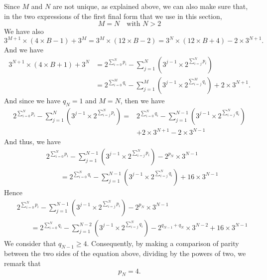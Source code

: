 \documentclass[11pt,a4paper]{article}
\newcommand{\Pf}[4]{2^{\sum_{#4=0}^{#1}#3_{#4}}-\sum_{j=1}^{#2}\left(3^{j-1}\times 2^{\sum_{#4=j}^{#1}#3_{#4}}\right)}
\theoremstyle{definition}
\begin{document}
Since $M$ and $N$ are not unique, as explained above, we can also make sure that, in the two
expressions of the first final form that we use in this section,
\begin{equation}
M=N\quad\text{with }N>2
\end{equation}
We have also
\begin{equation}
3^{M+1}\times(4\times B-1)+3^{M}=3^{M}\times(12\times B-2)=3^{N}\times(12\times B+4)-2\times 3^{N+1}.
\end{equation}
And we have
\begin{equation}
\begin{split}
3^{N+1}\times(4\times B+1)+3^{N}&=\Pf{N}{N}{p}{i}\\
&=\Pf{M}{M}{q}{i}+2\times 3^{N+1}.
\end{split}
\end{equation}
And since we have $q_N=1$ and $M=N$, then we have
\begin{equation}
\begin{split}
\Pf{N}{N}{p}{i}
={}&2^{\sum_{i=0}^{N}q_i}-\sum_{j=1}^{N-1}\left(3^{j-1}\times 2^{\sum_{i=j}^{N}q_i}\right)\\
&+2\times 3^{N+1}-2\times 3^{N-1}
\end{split}
\end{equation}
And thus, we have
\begin{equation}
\begin{split}
&2^{\sum_{i=0}^{N}p_i}-\sum_{j=1}^{N-1}\left(3^{j-1}\times 2^{\sum_{i=j}^{N}p_i}\right)-2^{p_N}\times 3^{N-1}\\
&\qquad=2^{\sum_{i=0}^{N}q_i}-\sum_{j=1}^{N-1}\left(3^{j-1}\times 2^{\sum_{i=j}^{N}q_i}\right)+16\times 3^{N-1}
\end{split}
\end{equation}
Hence
\begin{equation}
\begin{split}
&2^{\sum_{i=0}^{N}p_i}-\sum_{j=1}^{N-1}\left(3^{j-1}\times 2^{\sum_{i=j}^{N}p_i}\right)-2^{p_N}\times 3^{N-1}\\
&\qquad=2^{\sum_{i=0}^{N}q_i}-\sum_{j=1}^{N-2}\left(3^{j-1}\times 2^{\sum_{i=j}^{N}q_i}\right)-2^{q_{N-1}+q_N}\times 3^{N-2}+16\times 3^{N-1}
\end{split}
\end{equation}
We consider that $q_{N-1}\ge 4$. Consequently, by making a comparison of parity between the
two sides of the equation above, dividing by the powers of two, we remark that
\begin{equation}
p_N=4.
\end{equation}
\end{document}

